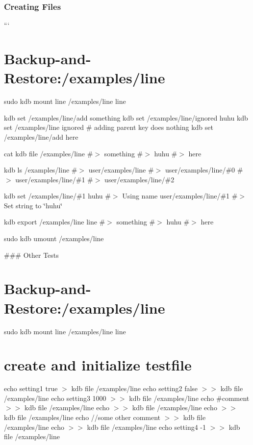 \subsubsection*{Creating Files}

``` \section*{Backup-\/and-\/\+Restore\+:/examples/line}

sudo kdb mount line /examples/line line

kdb set /examples/line/add something kdb set /examples/line/ignored huhu kdb set /examples/line ignored \# adding parent key does nothing kdb set /examples/line/add here

cat {\ttfamily kdb file /examples/line} \#$>$ something \#$>$ huhu \#$>$ here

kdb ls /examples/line \#$>$ user/examples/line \#$>$ user/examples/line/\#0 \#$>$ user/examples/line/\#1 \#$>$ user/examples/line/\#2

kdb set /examples/line/\#1 huhu \#$>$ Using name user/examples/line/\#1 \#$>$ Set string to \char`\"{}huhu\char`\"{}

kdb export /examples/line line \#$>$ something \#$>$ huhu \#$>$ here

sudo kdb umount /examples/line 
\begin{DoxyCode}
### Other Tests
\end{DoxyCode}
 \section*{Backup-\/and-\/\+Restore\+:/examples/line}

sudo kdb mount line /examples/line line

\section*{create and initialize testfile}

echo \textquotesingle{}setting1 true\textquotesingle{} $>$ {\ttfamily kdb file /examples/line} echo \textquotesingle{}setting2 false\textquotesingle{} $>$$>$ {\ttfamily kdb file /examples/line} echo \textquotesingle{}setting3 1000\textquotesingle{} $>$$>$ {\ttfamily kdb file /examples/line} echo \textquotesingle{}\#comment\textquotesingle{} $>$$>$ {\ttfamily kdb file /examples/line} echo $>$$>$ {\ttfamily kdb file /examples/line} echo $>$$>$ {\ttfamily kdb file /examples/line} echo \textquotesingle{}//some other comment\textquotesingle{} $>$$>$ {\ttfamily kdb file /examples/line} echo $>$$>$ {\ttfamily kdb file /examples/line} echo \textquotesingle{}setting4 -\/1\textquotesingle{} $>$$>$ {\ttfamily kdb file /examples/line}

